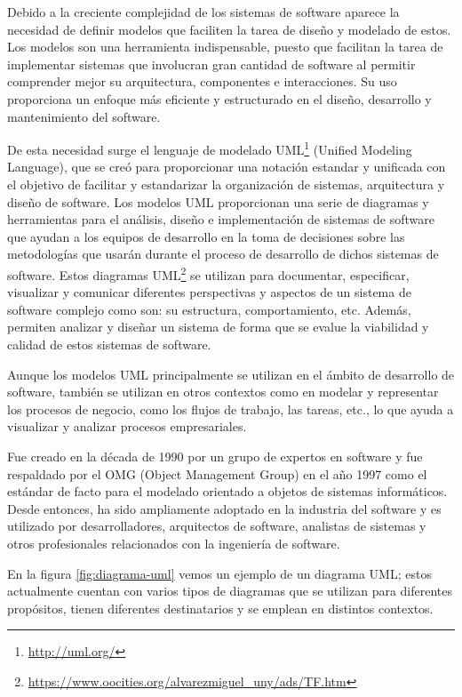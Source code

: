 \documentclass[a4paper, 12pt]{book}
\begin{document}
Debido a la creciente complejidad de los sistemas de software aparece la necesidad de definir modelos que faciliten la tarea de diseño y modelado de estos. 
Los modelos son una herramienta indispensable, puesto que facilitan la tarea de implementar sistemas que involucran gran cantidad de software al permitir comprender mejor su arquitectura, componentes e interacciones.
Su uso proporciona un enfoque más eficiente y estructurado en el diseño, desarrollo y mantenimiento del software.


De esta necesidad surge el lenguaje de modelado UML\footnote{\url{http://uml.org/}} (Unified Modeling Language), que se creó para proporcionar una notación estandar y unificada con el objetivo de facilitar y estandarizar la organización de sistemas, arquitectura y diseño de software.
Los modelos UML proporcionan una serie de diagramas y herramientas para el análisis, diseño e implementación de sistemas de software que ayudan a los equipos de desarrollo en la toma de decisiones sobre las metodologías que usarán durante el proceso de desarrollo de dichos sistemas de software. 
Estos diagramas UML\footnote{\url{https://www.oocities.org/alvarezmiguel_uny/ads/TF.htm}} se utilizan para documentar, especificar, visualizar y comunicar diferentes perspectivas y aspectos de un sistema de software complejo como son: su estructura, comportamiento, etc.
Además, permiten analizar y diseñar un sistema de forma que se evalue la viabilidad y calidad de estos sistemas de software.


Aunque los modelos UML principalmente se utilizan en el ámbito de desarrollo de software, también se utilizan en otros contextos como en modelar y representar los procesos de negocio, como los flujos de trabajo, las tareas, etc., lo que ayuda a visualizar y analizar procesos empresariales.


Fue creado en la década de 1990 por un grupo de expertos en software y fue respaldado por el OMG (Object Management Group) en el año 1997 como el estándar de facto para el modelado orientado a objetos de sistemas informáticos. 
Desde entonces, ha sido ampliamente adoptado en la industria del software y es utilizado por desarrolladores, arquitectos de software, analistas de sistemas y otros profesionales relacionados con la ingeniería de software. 


En la figura \ref{fig:diagrama-uml} vemos un ejemplo de un diagrama UML; estos actualmente cuentan con varios tipos de diagramas que se utilizan para diferentes propósitos, tienen diferentes destinatarios y se emplean en distintos contextos.
\end{document}
